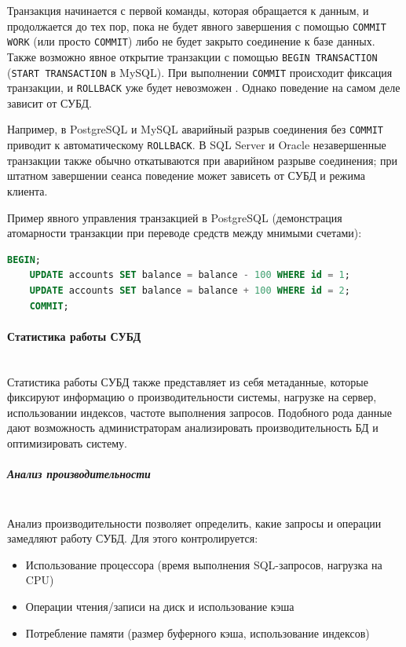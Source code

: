 Транзакция начинается с первой команды, которая обращается к данным, и продолжается до тех пор, пока не будет явного завершения с помощью \texttt{COMMIT WORK} (или просто \texttt{COMMIT}) либо не будет закрыто соединение к базе данных. Также возможно явное открытие транзакции с помощью \texttt{BEGIN TRANSACTION} (\texttt{START TRANSACTION} в MySQL). При выполнении \texttt{COMMIT} происходит фиксация транзакции, и \texttt{ROLLBACK} уже будет невозможен \autocite{Pirogov2009}. Однако поведение на самом деле зависит от СУБД.

Например, в PostgreSQL и MySQL аварийный разрыв соединения без \texttt{COMMIT} приводит к автоматическому \texttt{ROLLBACK}. В SQL Server и Oracle незавершенные транзакции также обычно откатываются при аварийном разрыве соединения; при штатном завершении сеанса поведение может зависеть от СУБД и режима клиента.

Пример явного управления транзакцией в PostgreSQL (демонстрация атомарности транзакции при переводе средств между мнимыми счетами):
\begin{lstlisting}[language=SQL]
    BEGIN;
    UPDATE accounts SET balance = balance - 100 WHERE id = 1;
    UPDATE accounts SET balance = balance + 100 WHERE id = 2;
    COMMIT;           
\end{lstlisting}


\paragraph{Статистика работы СУБД} ~\\

Статистика работы СУБД также представляет из себя метаданные, которые фиксируют информацию о производительности системы, нагрузке на сервер, использовании индексов, частоте выполнения запросов. Подобного рода данные дают возможность администраторам анализировать производительность БД и оптимизировать систему.

\subparagraph{Анализ производительности} ~\\

Анализ производительности позволяет определить, какие запросы и операции замедляют работу СУБД. Для этого контролируется:
\begin{itemize}
    \item Использование процессора (время выполнения SQL-запросов, нагрузка на CPU)
    \item Операции чтения/записи на диск и использование кэша
    \item Потребление памяти (размер буферного кэша, использование индексов)
\end{itemize}

